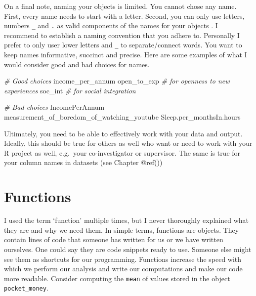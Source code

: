 \documentclass[
]{book}
\newenvironment{Shaded}{\begin{snugshade}}{\end{snugshade}}
\newcommand{\CommentTok}[1]{\textcolor[rgb]{0.56,0.35,0.01}{\textit{#1}}}
\newcommand{\NormalTok}[1]{#1}
\begin{document}
On a final note, naming your objects is limited. You cannot chose any name. First, every name needs to start with a letter. Second, you can only use letters, numbers \texttt{\_} and \texttt{.} as valid components of the names for your objects \citep[see also][Chapter 4.2.]{wickham2016r}. I recommend to establish a naming convention that you adhere to. Personally I prefer to only user lower letters and \texttt{\_} to separate/connect words. You want to keep names informative, succinct and precise. Here are some examples of what I would consider good and bad choices for names.

\begin{Shaded}
\begin{Highlighting}[]
\CommentTok{\# Good choices}
\NormalTok{income\_per\_annum}
\NormalTok{open\_to\_exp          }\CommentTok{\# for \textquotesingle{}openness to new experiences\textquotesingle{}}
\NormalTok{soc\_int              }\CommentTok{\# for \textquotesingle{}social integration\textquotesingle{}}
 
\CommentTok{\# Bad choices}
\NormalTok{IncomePerAnnum}
\NormalTok{measurement\_of\_boredom\_of\_watching\_youtube}
\NormalTok{Sleep.per\_monthsIn.hours}
\end{Highlighting}
\end{Shaded}

Ultimately, you need to be able to effectively work with your data and output. Ideally, this should be true for others as well who want or need to work with your R project as well, e.g.~your co-investigator or supervisor. The same is true for your column names in datasets (see Chapter @ref())

\hypertarget{functions}{%
\section{Functions}\label{functions}}

I used the term `function' multiple times, but I never thoroughly explained what they are and why we need them. In simple terms, functions are objects. They contain lines of code that someone has written for us or we have written ourselves. One could say they are code snippets ready to use. Someone else might see them as shortcuts for our programming. Functions increase the speed with which we perform our analysis and write our computations and make our code more readable. Consider computing the \texttt{mean} of values stored in the object \texttt{pocket\_money}.
\end{document}
